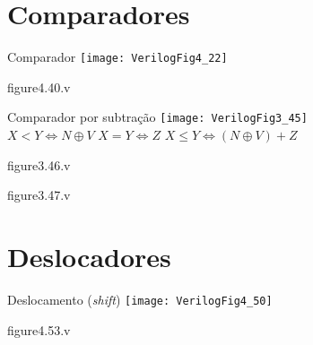

\subtitle{Outros Circuitos Combinacionais} %



\begin{frame}
	\titlepage
\end{frame} 


\section{Comparadores}

\begin{frame}{Comparador}   \centering
    \texttt{[image: VerilogFig4\_22]} \\
\end{frame}

\begin{frame}[fragile]{figure4.40.v}
\end{frame} 

\begin{frame}{Comparador por subtração}   \centering
    \texttt{[image: VerilogFig3\_45]} \\
    \scriptsize $X<Y \iff N \oplus V$ \hfill $X=Y \iff Z$ \hfill $X\leq Y \iff (N \oplus V) + Z$
\end{frame}

\begin{frame}[fragile]{figure3.46.v}
\end{frame} 

\begin{frame}[fragile]{figure3.47.v}
\end{frame} 

\section{Deslocadores}

\begin{frame}{Deslocamento (\textit{shift})} \centering
    \texttt{[image: VerilogFig4\_50]}
\end{frame}

\begin{frame}[fragile]{figure4.53.v}
\end{frame} 

